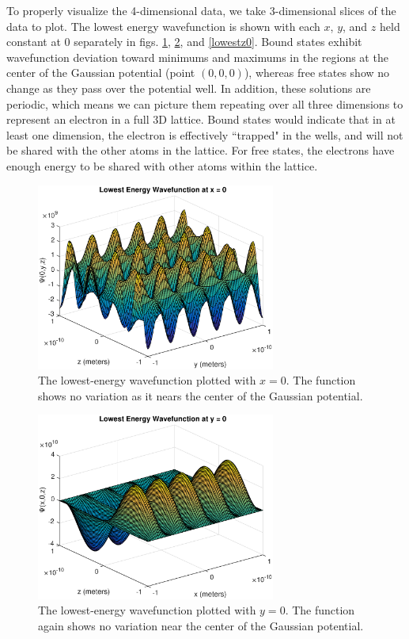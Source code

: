 \documentclass[12pt]{article}
\begin{document}
To properly visualize the 4-dimensional data, we take 3-dimensional slices of the data to plot.  The lowest energy wavefunction is shown with each $x$, $y$, and $z$ held constant at 0 separately in figs. \ref{lowestx0}, \ref{lowesty0}, and \ref{lowestz0}.  Bound states exhibit wavefunction deviation toward minimums and maximums in the regions at the center of the Gaussian potential (point $(0,0,0)$), whereas free states show no change as they pass over the potential well.  In addition, these solutions are periodic, which means we can picture them repeating over all three dimensions to represent an electron in a full 3D lattice.  Bound states would indicate that in at least one dimension, the electron is effectively ``trapped" in the wells, and will not be shared with the other atoms in the lattice.  For free states, the electrons have enough energy to be shared with other atoms within the lattice.

\begin{figure}
\begin{center}
\includegraphics[width=0.7\textwidth]{./pics/lowest3dx0.eps}
\end{center}
\caption{\label{lowestx0}The lowest-energy wavefunction plotted with $x=0$.  The function shows no variation as it nears the center of the Gaussian potential.}
\end{figure}

\begin{figure}
\begin{center}
\includegraphics[width=0.7\textwidth]{./pics/lowest3dy0.eps}
\end{center}
\caption{\label{lowesty0}The lowest-energy wavefunction plotted with $y=0$.  The function again shows no variation near the center of the Gaussian potential.}
\end{figure}
\end{document}
